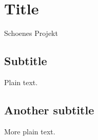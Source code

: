 \documentclass{article}
\begin{document}
\section{Title}
Schoenes Projekt
\subsection{Subtitle}

Plain text.

\subsection{Another subtitle}

More plain text.
\end{document}
